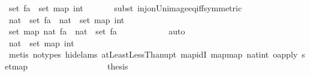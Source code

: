 \begin{isabellebody}
\ {\isachardoublequoteopen}set\ {\isacharquery}fa\ {\isacharequal}\ set\ {\isacharparenleft}map\ int\ {\isacharbrackleft}{}{\isachardot}{\isachardot}{\isacharless}{}{}{}{}{\isacharplus}{}{\isacharbrackright}{\isacharparenright}{\isachardoublequoteclose}\isanewline
\ \ \ \ \isamarkupfalse%
\ {\isacharparenleft}subst\ inj{\isacharunderscore}on{\isacharunderscore}Un{\isacharunderscore}image{\isacharunderscore}eq{\isacharunderscore}iff{\isacharbrackleft}symmetric{\isacharbrackright}{\isacharparenright}\isanewline
\ \ \ \ \ \ \isamarkupfalse%
\ {\isachardoublequoteopen}nat\ {\isacharbackquote}\ set\ {\isacharquery}fa\ {\isacharequal}\ nat\ {\isacharbackquote}\ set\ {\isacharparenleft}map\ int\ {\isacharbrackleft}{}{\isachardot}{\isachardot}{\isacharless}{}{}{}{}{\isacharplus}{}{\isacharbrackright}{\isacharparenright}{\isachardoublequoteclose}\isanewline
\ \ \ \ \ \ \isamarkupfalse%
{\isacharminus}\isanewline
\ \ \ \ \ \ \ \ \isamarkupfalse%
\ {\isachardoublequoteopen}set\ {\isacharparenleft}map\ nat\ {\isacharquery}fa{\isacharparenright}\ {\isacharequal}\ nat\ {\isacharbackquote}\ set\ {\isacharquery}fa{\isachardoublequoteclose}\isanewline
\ \ \ \ \ \ \ \ \ \ \isamarkupfalse%
\ auto\isanewline
\ \ \ \ \ \ \ \ \isamarkupfalse%
\isanewline
\ \ \ \ \ \ \ \ \isamarkupfalse%
\ {\isachardoublequoteopen}nat\ {\isacharbackquote}\ set\ {\isacharparenleft}map\ int\ {\isacharbrackleft}{}{\isachardot}{\isachardot}{\isacharless}{}{}{}{}{\isacharplus}{}{\isacharbrackright}{\isacharparenright}\ {\isacharequal}\ {\isacharbraceleft}{}{\isachardot}{\isachardot}{\isacharless}{}{}{}{}{\isacharplus}{}{\isacharbraceright}{\isachardoublequoteclose}\isanewline
\ \ \ \ \ \ \ \ \ \ \isamarkupfalse%
\ {\isacharparenleft}metis\ {\isacharparenleft}no{\isacharunderscore}types{\isacharcomma}\ hide{\isacharunderscore}lams{\isacharparenright}\ atLeastLessThan{\isacharunderscore}upt\ map{\isacharunderscore}idI\ map{\isacharunderscore}map\ nat{\isacharunderscore}int\ o{\isacharunderscore}apply\ set{\isacharunderscore}map{\isacharparenright}\isanewline
\ \ \ \ \ \ \ \ \isamarkupfalse%
\isanewline
\ \ \ \ \ \ \ \ \isamarkupfalse%
\ {\isacharquery}thesis\isanewline

\end{isabellebody}
